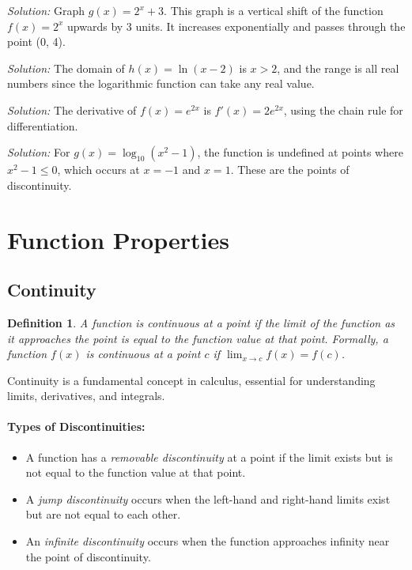 \documentclass[a4paper,12pt]{book}
\newenvironment{solution}[1][]
{\par\noindent\textit{Solution:} \rmfamily}{\medskip}
\newtheorem{definition}{Definition}
\begin{document}
\begin{solution}[7]
Graph \( g(x) = 2^x + 3 \). This graph is a vertical shift of the function \( f(x) = 2^x \) upwards by 3 units. It increases exponentially and passes through the point (0, 4).
\end{solution}

\begin{solution}[8]
The domain of \( h(x) = \ln(x - 2) \) is \( x > 2 \), and the range is all real numbers since the logarithmic function can take any real value.
\end{solution}

\begin{solution}[9]
The derivative of \( f(x) = e^{2x} \) is \( f'(x) = 2e^{2x} \), using the chain rule for differentiation.
\end{solution}

\begin{solution}[10]
For \( g(x) = \log_{10}(x^2 - 1) \), the function is undefined at points where \( x^2 - 1 \leq 0 \), which occurs at \( x = -1 \) and \( x = 1 \). These are the points of discontinuity.
\end{solution}


\section{Function Properties}
\subsection{Continuity}
\begin{definition}
A function is continuous at a point if the limit of the function as it approaches the point is equal to the function value at that point. Formally, a function \( f(x) \) is continuous at a point \( c \) if \( \lim_{x \to c} f(x) = f(c) \).
\end{definition}

Continuity is a fundamental concept in calculus, essential for understanding limits, derivatives, and integrals.

\paragraph{Types of Discontinuities:}
\begin{itemize}
    \item A function has a \textit{removable discontinuity} at a point if the limit exists but is not equal to the function value at that point.
    \item A \textit{jump discontinuity} occurs when the left-hand and right-hand limits exist but are not equal to each other.
    \item An \textit{infinite discontinuity} occurs when the function approaches infinity near the point of discontinuity.
\end{itemize}
\end{document}
